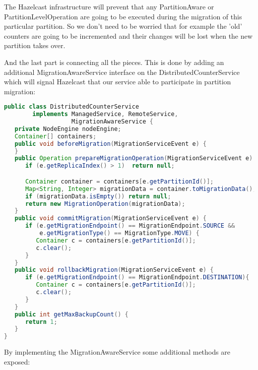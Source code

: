 The Hazelcast infrastructure will prevent that any PartitionAware or PartitionLevelOperation are going to be executed during the migration of this particular partition. So we don't need to be worried that for example the 'old' counters are going to be incremented and their changes will be lost when the new partition takes over.

And the last part is connecting all the pieces. This is done by adding an additional MigrationAwareService interface on the DistributedCounterService which will signal Hazelcast that our service able to participate in partition migration:
\begin{lstlisting}[language=java]
public class DistributedCounterService 
        implements ManagedService, RemoteService, 
                   MigrationAwareService {
   private NodeEngine nodeEngine;
   Container[] containers;
   public void beforeMigration(MigrationServiceEvent e) {
   } 
   public Operation prepareMigrationOperation(MigrationServiceEvent e) {
      if (e.getReplicaIndex() > 1)  return null;

      Container container = containers[e.getPartitionId()];
      Map<String, Integer> migrationData = container.toMigrationData();
      if (migrationData.isEmpty()) return null;
      return new MigrationOperation(migrationData);
   }
   public void commitMigration(MigrationServiceEvent e) {
      if (e.getMigrationEndpoint() == MigrationEndpoint.SOURCE && 
          e.getMigrationType() == MigrationType.MOVE) {
         Container c = containers[e.getPartitionId()];
         c.clear();
      }
   }
   public void rollbackMigration(MigrationServiceEvent e) {
      if (e.getMigrationEndpoint() == MigrationEndpoint.DESTINATION){
         Container c = containers[e.getPartitionId()];
         c.clear();
      }
   }
   public int getMaxBackupCount() {
      return 1;
   }
}
\end{lstlisting}
By implementing the MigrationAwareService some additional methods are exposed:

